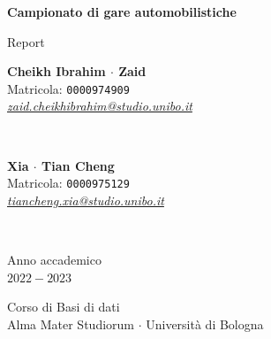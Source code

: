 \documentclass[11pt]{article}
\begin{document}
\begin{titlepage}
    \begin{center}
        \vspace*{1.5cm}
            
        \Huge
        \textbf{Campionato di gare automobilistiche}
            
        \vspace{0.3cm}
        \LARGE
        Report\\[0.2em]

        \vspace{1.5cm}
          
        \begin{minipage}[t]{0.47\textwidth}
            \begin{center}
                \parbox{65mm}{\centering\large {\bf Cheikh Ibrahim $\cdot$ Zaid} \\[0.3em] Matricola: \texttt{0000974909} \\[0.3em] \href{mailto:zaid.cheikhibrahim@studio.unibo.it}{\textit{zaid.cheikhibrahim@studio.unibo.it}}} \\[2em]
            \end{center}
		\end{minipage}
		\hfill
		\begin{minipage}[t]{0.47\textwidth}\raggedleft
            \begin{center}
                \parbox{65mm}{\centering\large {\bf Xia $\cdot$ Tian Cheng} \\[0.3em] Matricola: \texttt{0000975129} \\[0.3em] \href{mailto:tiancheng.xia@studio.unibo.it}{\textit{tiancheng.xia@studio.unibo.it}}} \\[2em]
            \end{center}
		\end{minipage}  
            
        \vspace{9cm}
            
        Anno accademico\\
        $2022 - 2023$
            
        \vspace{0.8cm}
            
            
        \Large
        Corso di Basi di dati\\
        Alma Mater Studiorum $\cdot$ Università di Bologna\\
            
    \end{center}
\end{titlepage}
\pagebreak
\end{document}
